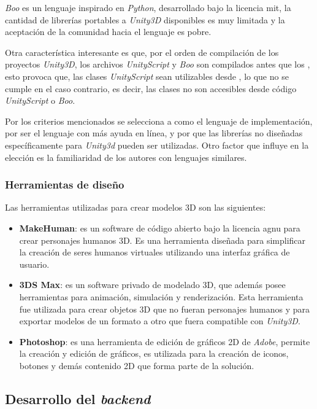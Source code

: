 \textit{Boo} es un lenguaje inspirado en \textit{Python}, desarrollado bajo la
licencia \Gls{mit}, la cantidad de librerías portables a \textit{Unity3D}
disponibles es muy limitada y la aceptación de la comunidad hacia el lenguaje es
pobre.

Otra característica interesante es que, por el orden de compilación de los
proyectos \textit{Unity3D}, los archivos \textit{UnityScript} y \textit{Boo} son
compilados antes que los \cs{}, esto provoca que, las clases
\textit{UnityScript} sean utilizables desde \cs{}, lo que no se cumple en el
caso contrario, es decir, las clases \cs{} no son accesibles desde código
\textit{UnityScript} o \textit{Boo}.

Por los criterios mencionados se selecciona a \cs{} como el lenguaje de
implementación, por ser el lenguaje con más ayuda en línea, y por que las
librerías no diseñadas específicamente para \textit{Unity3d} pueden ser
utilizadas. Otro factor que influye en la elección es la familiaridad de los
autores con lenguajes similares. 

\subsubsection{Herramientas de diseño}

Las herramientas utilizadas para crear modelos 3D son las siguientes:

\begin{itemize}
\item \textbf{MakeHuman}: es un software de código abierto bajo la licencia
    \Gls{agnu} para crear personajes humanos 3D. Es una herramienta diseñada
    para simplificar la creación de seres humanos virtuales utilizando una
    interfaz gráfica de usuario\cite{makehuman}. 
\item \textbf{3DS Max}: es un software privado de modelado 3D, que además posee
    herramientas para animación, simulación y renderización. Esta herramienta
    fue utilizada para crear objetos 3D que no fueran personajes humanos y para
    exportar modelos de un formato a otro que fuera compatible con
    \textit{Unity3D}\cite{3dsmax}.
\item \textbf{Photoshop}: es una herramienta de edición de gráficos 2D de
    \textit{Adobe}, permite la creación y edición de gráficos, es utilizada para
    la creación de iconos, botones y demás contenido 2D que forma parte de la
    solución.
\end{itemize}

\subsection{Desarrollo del \textit{backend}}

